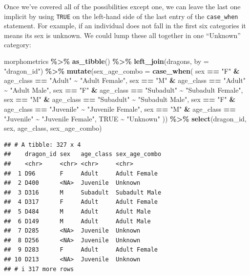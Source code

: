 \documentclass[
]{book}
\newenvironment{Shaded}{\begin{snugshade}}{\end{snugshade}}
\newcommand{\AttributeTok}[1]{\textcolor[rgb]{0.13,0.29,0.53}{#1}}
\newcommand{\ConstantTok}[1]{\textcolor[rgb]{0.56,0.35,0.01}{#1}}
\newcommand{\FunctionTok}[1]{\textcolor[rgb]{0.13,0.29,0.53}{\textbf{#1}}}
\newcommand{\NormalTok}[1]{#1}
\newcommand{\SpecialCharTok}[1]{\textcolor[rgb]{0.81,0.36,0.00}{\textbf{#1}}}
\newcommand{\StringTok}[1]{\textcolor[rgb]{0.31,0.60,0.02}{#1}}
\begin{document}
Once we've covered all of the possibilities except one, we can leave the last
one implicit by using \texttt{TRUE} on the left-hand side of the last entry of the
\texttt{case\_when} statement. For example, if an individual does not fall in the first
six categories it means its sex is unknown. We could lump these all together in
one ``Unknown'' category:

\begin{Shaded}
\begin{Highlighting}[]
\NormalTok{morphometrics }\SpecialCharTok{\%\textgreater{}\%} 
  \FunctionTok{as\_tibble}\NormalTok{() }\SpecialCharTok{\%\textgreater{}\%} 
  \FunctionTok{left\_join}\NormalTok{(dragons, }\AttributeTok{by =} \StringTok{"dragon\_id"}\NormalTok{) }\SpecialCharTok{\%\textgreater{}\%} 
  \FunctionTok{mutate}\NormalTok{(}\AttributeTok{sex\_age\_combo =} \FunctionTok{case\_when}\NormalTok{(}
\NormalTok{    sex }\SpecialCharTok{==} \StringTok{"F"} \SpecialCharTok{\&}\NormalTok{ age\_class }\SpecialCharTok{==} \StringTok{"Adult"} \SpecialCharTok{\textasciitilde{}} \StringTok{"Adult Female"}\NormalTok{,}
\NormalTok{    sex }\SpecialCharTok{==} \StringTok{"M"} \SpecialCharTok{\&}\NormalTok{ age\_class }\SpecialCharTok{==} \StringTok{"Adult"} \SpecialCharTok{\textasciitilde{}} \StringTok{"Adult Male"}\NormalTok{,}
\NormalTok{    sex }\SpecialCharTok{==} \StringTok{"F"} \SpecialCharTok{\&}\NormalTok{ age\_class }\SpecialCharTok{==} \StringTok{"Subadult"} \SpecialCharTok{\textasciitilde{}} \StringTok{"Subadult Female"}\NormalTok{,}
\NormalTok{    sex }\SpecialCharTok{==} \StringTok{"M"} \SpecialCharTok{\&}\NormalTok{ age\_class }\SpecialCharTok{==} \StringTok{"Subadult"} \SpecialCharTok{\textasciitilde{}} \StringTok{"Subadult Male"}\NormalTok{,}
\NormalTok{    sex }\SpecialCharTok{==} \StringTok{"F"} \SpecialCharTok{\&}\NormalTok{ age\_class }\SpecialCharTok{==} \StringTok{"Juvenile"} \SpecialCharTok{\textasciitilde{}} \StringTok{"Juvenile Female"}\NormalTok{,}
\NormalTok{    sex }\SpecialCharTok{==} \StringTok{"M"} \SpecialCharTok{\&}\NormalTok{ age\_class }\SpecialCharTok{==} \StringTok{"Juvenile"} \SpecialCharTok{\textasciitilde{}} \StringTok{"Juvenile Female"}\NormalTok{,}
    \ConstantTok{TRUE} \SpecialCharTok{\textasciitilde{}} \StringTok{"Unknown"}
\NormalTok{    )) }\SpecialCharTok{\%\textgreater{}\%} 
  \FunctionTok{select}\NormalTok{(dragon\_id, sex, age\_class, sex\_age\_combo)}
\end{Highlighting}
\end{Shaded}

\begin{verbatim}
## # A tibble: 327 x 4
##    dragon_id sex   age_class sex_age_combo
##    <chr>     <chr> <chr>     <chr>        
##  1 D96       F     Adult     Adult Female 
##  2 D400      <NA>  Juvenile  Unknown      
##  3 D316      M     Subadult  Subadult Male
##  4 D317      F     Adult     Adult Female 
##  5 D484      M     Adult     Adult Male   
##  6 D149      M     Adult     Adult Male   
##  7 D285      <NA>  Juvenile  Unknown      
##  8 D256      <NA>  Juvenile  Unknown      
##  9 D283      F     Adult     Adult Female 
## 10 D213      <NA>  Juvenile  Unknown      
## # i 317 more rows
\end{verbatim}
\end{document}
